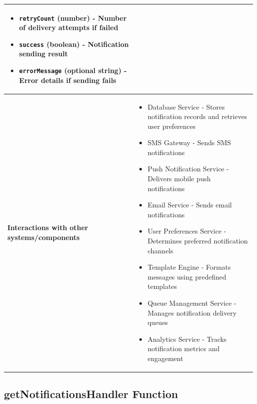 \documentclass[11pt,a4paper]{article}
\begin{document}
\begin{longtable}{|p{4cm}|p{12cm}|}
\begin{itemize}[nosep]
\item \texttt{retryCount} (number) - Number of delivery attempts if failed
\item \texttt{success} (boolean) - Notification sending result
\item \texttt{errorMessage} (optional string) - Error details if sending fails
\end{itemize} \\
\hline
\textbf{Interactions with other systems/components} & 
\begin{itemize}[nosep]
\item Database Service - Stores notification records and retrieves user preferences
\item SMS Gateway - Sends SMS notifications
\item Push Notification Service - Delivers mobile push notifications
\item Email Service - Sends email notifications
\item User Preferences Service - Determines preferred notification channels
\item Template Engine - Formats messages using predefined templates
\item Queue Management Service - Manages notification delivery queues
\item Analytics Service - Tracks notification metrics and engagement
\end{itemize} \\
\hline
\end{longtable}

\subsection{getNotificationsHandler Function}
\end{document}
